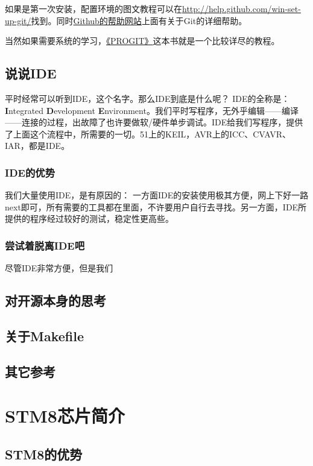 \documentclass[a4paper]{book}
\newcommand{\chap}[1]{\newpage\thispagestyle{empty}\chapter{#1}\label{chap:\thechapter}}
\begin{document}
如果是第一次安装，配置环境的图文教程可以在\url{http://help.github.com/win-set-up-git/}找到。同时\href{http://help.github.com/}{Github的帮助网站}上面有关于Git的详细帮助。

当然如果需要系统的学习，\href{http://progit.org/}{《PROGIT》}这本书就是一个比较详尽的教程。

\section{说说IDE}

平时经常可以听到IDE，这个名字。那么IDE到底是什么呢？ IDE的全称是： \textbf{I}ntegrated \textbf{D}evelopment \textbf{E}nvironment。我们平时写程序，无外乎编辑------编译------连接的过程，出故障了也许要做软/硬件单步调试。IDE给我们写程序，提供了上面这个流程中，所需要的一切。51上的KEIL，AVR上的ICC、CVAVR、IAR，都是IDE。

\subsection{IDE的优势}

我们大量使用IDE，是有原因的： 一方面IDE的安装使用极其方便，网上下好一路next即可，所有需要的工具都在里面，不许要用户自行去寻找。另一方面，IDE所提供的程序经过较好的测试，稳定性更高些。

\subsection{尝试着脱离IDE吧}

尽管IDE非常方便，但是我们

\section{对开源本身的思考}

\section{关于Makefile}

\section{其它参考}

\chap{STM8芯片简介}

\section{STM8的优势}
\end{document}
